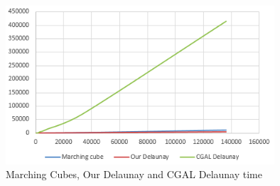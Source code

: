 \documentclass{article}
\begin{document}
\begin{figure}[h]
\begin{center}
\caption{Marching Cubes, Our Delaunay and CGAL Delaunay time}
 \label{fig:threegraph}
\includegraphics[width=10cm]{compare_mesher_graph.png}

\end{center}
\end{figure}
\end{document}
